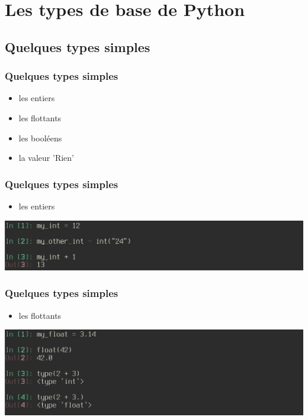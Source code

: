 \section{Les types de base de Python}
\subsection{Quelques types simples}

\begin{frame}
  \frametitle{Quelques types simples}
  \begin{itemize}
    \item<1-> les entiers
    \item<2-> les flottants
    \item<3-> les booléens
    \item<4-> la valeur 'Rien'
  \end{itemize}
\end{frame}

\begin{frame}
  \frametitle{Quelques types simples}
    \begin{itemize}
      \item les entiers
    \end{itemize}
    \includegraphics[scale=0.35]{type_int.png}
\end{frame}

\begin{frame}
  \frametitle{Quelques types simples}
    \begin{itemize}
      \item les flottants
    \end{itemize}
    \includegraphics[scale=0.35]{type_float.png}
\end{frame}

